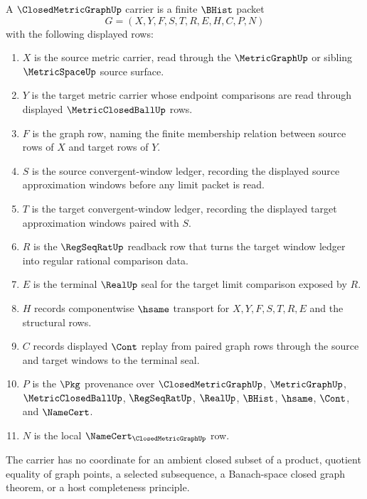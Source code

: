 \begin{definition}
\label{def:closed-metric-graph-carrier}
A $\ClosedMetricGraphUp$ carrier is a finite $\BHist$ packet
$$
G=(X,Y,F,S,T,R,E,H,C,P,N)
$$
with the following displayed rows:
\begin{enumerate}
\item $X$ is the source metric carrier, read through the $\MetricGraphUp$ or sibling $\MetricSpaceUp$ source surface.
\item $Y$ is the target metric carrier whose endpoint comparisons are read through displayed $\MetricClosedBallUp$ rows.
\item $F$ is the graph row, naming the finite membership relation between source rows of $X$ and target rows of $Y$.
\item $S$ is the source convergent-window ledger, recording the displayed source approximation windows before any limit packet is read.
\item $T$ is the target convergent-window ledger, recording the displayed target approximation windows paired with $S$.
\item $R$ is the $\RegSeqRatUp$ readback row that turns the target window ledger into regular rational comparison data.
\item $E$ is the terminal $\RealUp$ seal for the target limit comparison exposed by $R$.
\item $H$ records componentwise $\hsame$ transport for $X,Y,F,S,T,R,E$ and the structural rows.
\item $C$ records displayed $\Cont$ replay from paired graph rows through the source and target windows to the terminal seal.
\item $P$ is the $\Pkg$ provenance over $\ClosedMetricGraphUp$, $\MetricGraphUp$, $\MetricClosedBallUp$, $\RegSeqRatUp$, $\RealUp$, $\BHist$, $\hsame$, $\Cont$, and $\NameCert$.
\item $N$ is the local $\NameCert_{\ClosedMetricGraphUp}$ row.
\end{enumerate}
The carrier has no coordinate for an ambient closed subset of a product, quotient equality of graph points, a selected subsequence, a Banach-space closed graph theorem, or a host completeness principle.
\end{definition}

